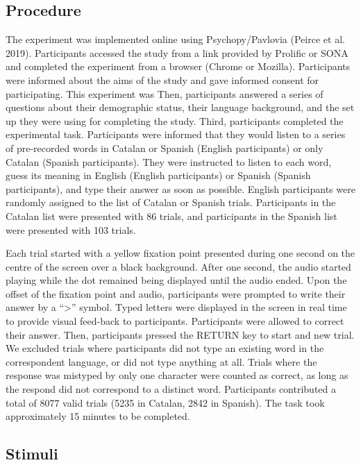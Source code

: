 \documentclass[
  man]{apa6}
\begin{document}
\hypertarget{procedure}{%
\subsection{Procedure}\label{procedure}}

The experiment was implemented online using Psychopy/Pavlovia (Peirce et
al. 2019). Participants accessed the study from a link provided by
Prolific or SONA and completed the experiment from a browser (Chrome or
Mozilla). Participants were informed about the aims of the study and
gave informed consent for participating. This experiment was Then,
participants answered a series of questions about their demographic
status, their language background, and the set up they were using for
completing the study. Third, participants completed the experimental
task. Participants were informed that they would listen to a series of
pre-recorded words in Catalan or Spanish (English participants) or only
Catalan (Spanish participants). They were instructed to listen to each
word, guess its meaning in English (English participants) or Spanish
(Spanish participants), and type their answer as soon as possible.
English participants were randomly assigned to the list of Catalan or
Spanish trials. Participants in the Catalan list were presented with 86
trials, and participants in the Spanish list were presented with 103
trials.

Each trial started with a yellow fixation point presented during one
second on the centre of the screen over a black background. After one
second, the audio started playing while the dot remained being displayed
until the audio ended. Upon the offset of the fixation point and audio,
participants were prompted to write their answer by a ``\textgreater{}''
symbol. Typed letters were displayed in the screen in real time to
provide visual feed-back to participants. Participants were allowed to
correct their answer. Then, participants pressed the RETURN key to start
and new trial. We excluded trials where participants did not type an
existing word in the correspondent language, or did not type anything at
all. Trials where the response was mistyped by only one character were
counted as correct, as long as the respond did not correspond to a
distinct word. Participants contributed a total of 8077 valid trials
(5235 in Catalan, 2842 in Spanish). The task took approximately 15
minutes to be completed.

\hypertarget{stimuli}{%
\subsection{Stimuli}\label{stimuli}}
\end{document}
